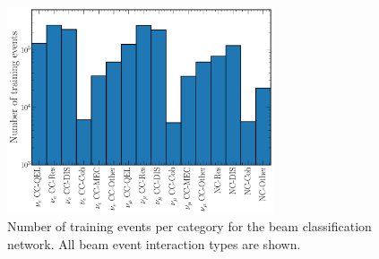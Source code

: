 \begin{figure} %
    \includegraphics[width=0.7\textwidth]{diagrams/7-results/explore_beam_training_sample.pdf}
    \caption[Number of training events per category for the beam classification network]
    {Number of training events per category for the beam classification network. All beam event
        interaction types are shown.}
    \label{fig:beam_training_sample}
\end{figure}

